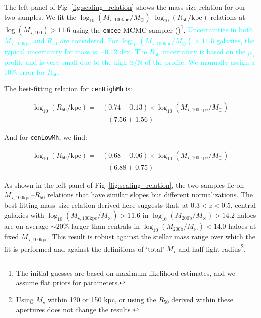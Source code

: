 \documentclass[a4paper,fleqn,usenatbib]{mnras}
\def\rbcg{\texttt{cenHighMh}}
\def\nbcg{\texttt{cenLowMh}}
\def\mstar{{$M_{\star}$}}
\def\logmhalo{{$\log_{10} (M_{\mathrm{200b}}/M_{\odot})$}}
\def\mtot{{$M_{\star,100\mathrm{kpc}}$}}
\def\logmtot{{$\log_{10} (M_{\star,100\mathrm{kpc}}/M_{\odot})$}}
\def\s2n{{$\mathrm{S}/\mathrm{N}$}}
\def\mden{{$\mu_{\star}$}}
\newcommand{\song}[1]{\textcolor{cyan}{#1}}
\begin{document}
    The left panel of Fig~\ref{fig:scaling_relation} shows the mass-size relation for 
    our two samples. 
    We fit the \logmtot{}-$\log_{10} (R_{\mathrm{50}}/\mathrm{kpc})$ relations at 
    $\log(M_{\star,100})>11.6$ using the \texttt{emcee} MCMC sampler 
    (\citealt{Emcee})\footnote{The initial guesses are based on maximum 
    likelihood estimates, and we assume flat priors for parameters.}.
    \song{
    Uncertainties in both \mtot{} and $R_{\mathrm{50}}$ are considered. 
    For \logmtot{}$>11.6$ galaxies, the typical uncertainty for mass is $\sim 0.12$
    dex.  
    The $R_{\mathrm{50}}$ uncertainty is based on the \mden{} profile and is very small 
    due to the high \s2n{} of the profile. 
    We manually assign a 10\% error for $R_{\mathrm{50}}$. 
    }
    
    The best-fitting relation for \rbcg{} is:
    
    \begin{equation}
        \begin{aligned}
        \log_{10} (R_{\mathrm{50}}/\mathrm{kpc}) = & (0.74\pm0.13) \times \log_{10} (M_{\star, 100\ \mathrm{kpc}}/M_{\odot}) \\ & -(7.56\pm1.56)
        \end{aligned}
    \end{equation}

    \noindent And for \nbcg{}, we find:
    
    \begin{equation}
        \begin{aligned}
        \log_{10} (R_{\mathrm{50}}/\mathrm{kpc}) = & (0.68\pm0.06) \times \log_{10} (M_{\star, 100\ \mathrm{kpc}}/M_{\odot}) \\ & -(6.88\pm0.75)
        \end{aligned}
    \end{equation}
    
    \noindent As shown in the left panel of Fig~\ref{fig:scaling_relation}, the two 
    samples lie on \mtot{}--$R_{\mathrm{50}}$ relations that have similar slopes but 
    different normalizations. The best-fitting mass--size relation derived here suggests 
    that, at $0.3 < z < 0.5$, central galaxies with \logmtot{}$>11.6$ in \logmhalo{}$>14.2$
    haloes are on average $\sim20$\% larger than centrals in \logmhalo{}$<14.0$
    haloes at fixed \mtot{}.
    This result is robust against the stellar mass range over which the fit is 
    performed and against the definitions of  `total' \mstar{} and half-light 
    radius\footnote{Using \mstar{} within 120 or 150 kpc, or using the 
    $R_{\mathrm{50}}$ derived within these apertures does not change the results.}. 
    
\end{document}
